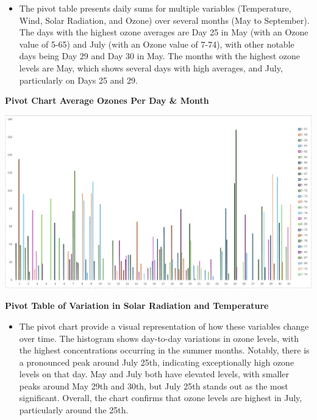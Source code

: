 \documentclass[
  letterpaper,
  DIV=11,
  numbers=noendperiod]{scrreprt}
\providecommand{\tightlist}{%
  \setlength{\itemsep}{0pt}\setlength{\parskip}{0pt}}\usepackage{longtable,booktabs,array}
\begin{document}
\begin{itemize}
\tightlist
\item
  The pivot table presents daily sums for multiple variables
  (Temperature, Wind, Solar Radiation, and Ozone) over several months
  (May to September). The days with the highest ozone averages are Day
  25 in May (with an Ozone value of 5-65) and July (with an Ozone value
  of 7-74), with other notable days being Day 29 and Day 30 in May. The
  months with the highest ozone levels are May, which shows several days
  with high averages, and July, particularly on Days 25 and 29.
\end{itemize}

\textbf{Pivot Chart Average Ozones Per Day \& Month}

\includegraphics{pivot4_chart_baruga.png}

\textbf{Pivot Table of Variation in Solar Radiation and Temperature}

\begin{itemize}
\tightlist
\item
  The pivot chart provide a visual representation of how these variables
  change over time. The histogram shows day-to-day variations in ozone
  levels, with the highest concentrations occurring in the summer
  months. Notably, there is a pronounced peak around July 25th,
  indicating exceptionally high ozone levels on that day. May and July
  both have elevated levels, with smaller peaks around May 29th and
  30th, but July 25th stands out as the most significant. Overall, the
  chart confirms that ozone levels are highest in July, particularly
  around the 25th.
\end{itemize}
\end{document}
